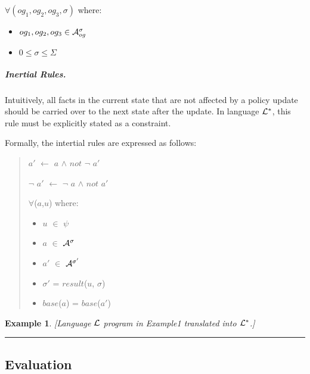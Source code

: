 \documentclass[10pt, twocolumn]{article}
\newtheorem{examp}{Example}
\newenvironment{example}{\begin{examp}\rm}{\rule{2mm}{2mm}\end{examp}}
\begin{document}
\begin{enumerate}
                $\forall (og_{1}, og_{2}, og_{3}, \sigma)$ where:

                \begin{itemize}
                  \item
                    $og_{1}, og_{2}, og_{3} \in {\cal A}^{\sigma}_{og}$
                  \item
                    $0 \leq \sigma \leq \Sigma$
                \end{itemize}
            \end{enumerate}

          \subparagraph{Inertial Rules.}

            Intuitively, all facts in the current state that are not affected
            by a policy update should be carried over to the next state after
            the update. In language ${\cal L}^{*}$, this rule must be
            explicitly stated as a constraint.

            Formally, the intertial rules are expressed as follows:

            \begin{quote}
              $a'$ $\leftarrow$ $a$ $\land$ $not$ $\lnot$ $a'$

              $\lnot$ $a'$ $\leftarrow$ $\lnot$ $a$ $\land$ $not$ $a'$

              $\forall$($a$,$u$) where:

              \begin{itemize}
                \item
                  $u$ $\in$ $\psi$
                \item
                  $a$ $\in$ ${\cal A}^{\sigma}$
                \item
                  $a'$ $\in$ ${\cal A}^{\sigma'}$
                \item
                  $\sigma'$ = $result$($u$, $\sigma$)
                \item
                  $base$($a$) = $base$($a'$)
              \end{itemize}
            \end{quote}

        \begin{example}
          [Language ${\cal L}$ program in Example1 translated into
          ${\cal L}^{*}$.]

        \end{example}

      \subsection{Evaluation}
\end{document}
